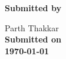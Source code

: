 \begin{titlepage}


\vfill

\textbf{\large Submitted by}

{\large Parth Thakkar}\\[0.5cm]





\textbf{\large Submitted on}\\
\textbf{\Large \today} %


\vfill %

\end{titlepage}
